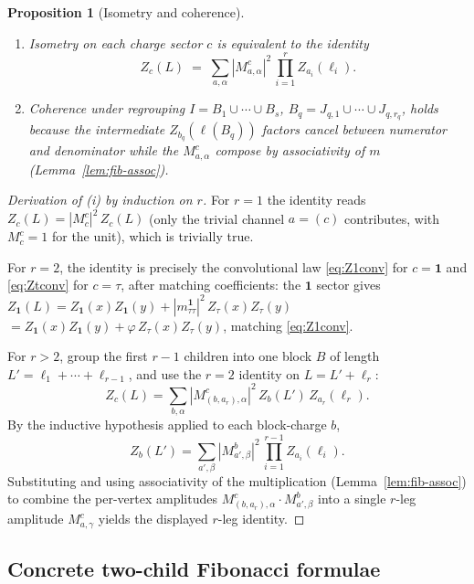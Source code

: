 \documentclass[11pt,a4paper]{article}
\newtheorem{proposition}[definition]{Proposition}
\theoremstyle{definition}
\newcommand{\one}{\mathbf{1}}
\begin{document}
\begin{proposition}[Isometry and coherence]\label{prop:rchild}
\begin{enumerate}[label=(\roman*)]
\item Isometry on each charge sector $c$ is equivalent to the identity
\[
Z_c(L) \;=\; \sum_{a,\alpha} |M^{c}_{a,\alpha}|^{2}\,
\prod_{i=1}^{r}Z_{a_i}(\ell_i).
\]
\item Coherence under regrouping
$I=B_1\cup\cdots\cup B_s$, $B_q = J_{q,1}\cup\cdots\cup J_{q,r_q}$,
holds because the intermediate $Z_{b_q}(\ell(B_q))$ factors cancel
between numerator and denominator while the $M^{c}_{a,\alpha}$ compose by
associativity of $m$ (Lemma~\ref{lem:fib-assoc}).
\end{enumerate}
\end{proposition}

\begin{proof}[Derivation of (i) by induction on $r$]
For $r=1$ the identity reads $Z_c(L) = |M^{c}_{c}|^{2}\,Z_c(L)$ (only the
trivial channel $a = (c)$ contributes, with $M^{c}_{c} = 1$ for the unit),
which is trivially true.

For $r=2$, the identity is precisely the convolutional law
\eqref{eq:Z1conv} for $c=\one$ and \eqref{eq:Ztconv} for $c=\tau$, after
matching coefficients: the $\one$ sector gives $Z_\one(L) =
Z_\one(x)Z_\one(y) + |m^\one_{\tau\tau}|^{2}\,Z_\tau(x)Z_\tau(y)$
$= Z_\one(x)Z_\one(y) + \varphi\,Z_\tau(x)Z_\tau(y)$, matching
\eqref{eq:Z1conv}.

For $r > 2$, group the first $r-1$ children into one block $B$ of length
$L' = \ell_1 + \cdots + \ell_{r-1}$, and use the $r=2$ identity on
$L = L' + \ell_r$:
\[
Z_c(L) = \sum_{b,\alpha} |M^{c}_{(b,a_r),\alpha}|^{2}\,Z_b(L')\,Z_{a_r}(\ell_r).
\]
By the inductive hypothesis applied to each block-charge $b$,
\[
Z_b(L') = \sum_{a',\beta}|M^{b}_{a',\beta}|^{2}\,\prod_{i=1}^{r-1}Z_{a_i}(\ell_i).
\]
Substituting and using associativity of the multiplication
(Lemma~\ref{lem:fib-assoc}) to combine the per-vertex amplitudes
$M^{c}_{(b,a_r),\alpha}\cdot M^{b}_{a',\beta}$ into a single $r$-leg
amplitude $M^{c}_{a,\gamma}$ yields the displayed $r$-leg identity.
\end{proof}

\subsection{Concrete two-child Fibonacci formulae}
\end{document}
